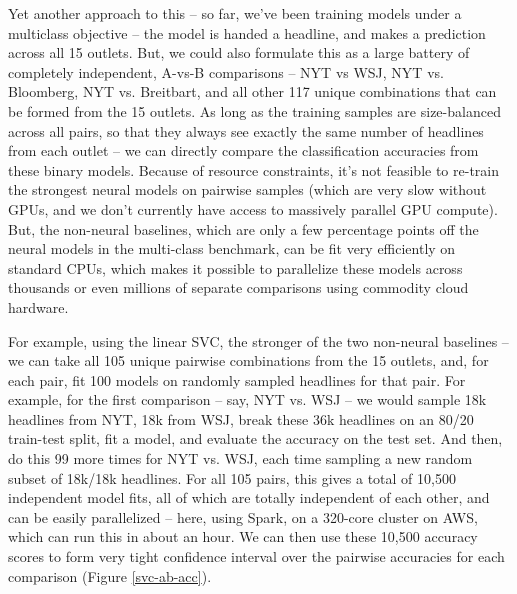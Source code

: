 \documentclass{scrartcl}
\begin{document}
Yet another approach to this -- so far, we've been training models under a multiclass objective -- the model is handed a headline, and makes a prediction across all 15 outlets. But, we could also formulate this as a large battery of completely independent, A-vs-B comparisons -- NYT vs WSJ, NYT vs. Bloomberg, NYT vs. Breitbart, and all other 117 unique combinations that can be formed from the 15 outlets. As long as the training samples are size-balanced across all pairs, so that they always see exactly the same number of headlines from each outlet -- we can directly compare the classification accuracies from these binary models. Because of resource constraints, it's not feasible to re-train the strongest neural models on pairwise samples (which are very slow without GPUs, and we don't currently have access to massively parallel GPU compute). But, the non-neural baselines, which are only a few percentage points off the neural models in the multi-class benchmark, can be fit very efficiently on standard CPUs, which makes it possible to parallelize these models across thousands or even millions of separate comparisons using commodity cloud hardware.

For example, using the linear SVC, the stronger of the two non-neural baselines -- we can take all 105 unique pairwise combinations from the 15 outlets, and, for each pair, fit 100 models on randomly sampled headlines for that pair. For example, for the first comparison -- say, NYT vs. WSJ -- we would sample 18k headlines from NYT, 18k from WSJ, break these 36k headlines on an 80/20 train-test split, fit a model, and evaluate the accuracy on the test set. And then, do this 99 more times for NYT vs. WSJ, each time sampling a new random subset of 18k/18k headlines. For all 105 pairs, this gives a total of 10,500 independent model fits, all of which are totally independent of each other, and can be easily parallelized -- here, using Spark, on a 320-core cluster on AWS, which can run this in about an hour. We can then use these 10,500 accuracy scores to form very tight confidence interval over the pairwise accuracies for each comparison (Figure \ref{svc-ab-acc}).
\end{document}
